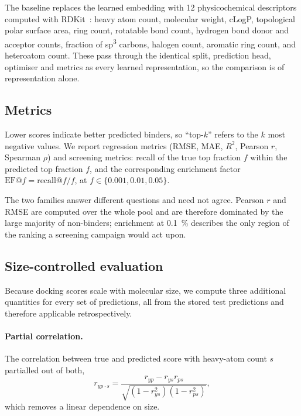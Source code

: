 The baseline replaces the learned embedding with \num{12} physicochemical
descriptors computed with RDKit~\citep{rdkit}: heavy atom count, molecular
weight, \mbox{cLogP}, topological polar surface area, ring count, rotatable
bond count, hydrogen bond donor and acceptor counts, fraction of sp\textsuperscript{3}
carbons, halogen count, aromatic ring count, and heteroatom count. These pass
through the identical split, prediction head, optimiser and metrics as every
learned representation, so the comparison is of representation alone.

\subsection{Metrics}

Lower scores indicate better predicted binders, so ``top-$k$'' refers to the
$k$ most negative values. We report regression metrics (RMSE, MAE, $R^2$,
Pearson $r$, Spearman $\rho$) and screening metrics: recall of the true top
fraction $f$ within the predicted top fraction $f$, and the corresponding
enrichment factor $\mathrm{EF}@f = \mathrm{recall}@f / f$, at
$f \in \{0.001, 0.01, 0.05\}$.

The two families answer different questions and need not agree. Pearson $r$
and RMSE are computed over the whole pool and are therefore dominated by the
large majority of non-binders; enrichment at \SI{0.1}{\percent} describes the
only region of the ranking a screening campaign would act upon.

\subsection{Size-controlled evaluation}
\label{sec:methods-size}

Because docking scores scale with molecular size, we compute three additional
quantities for every set of predictions, all from the stored test predictions
and therefore applicable retrospectively.

\paragraph{Partial correlation.}
The correlation between true and predicted score with heavy-atom count $s$
partialled out of both,
\begin{equation}
r_{yp \cdot s} = \frac{r_{yp} - r_{ys} r_{ps}}
                      {\sqrt{(1 - r_{ys}^2)(1 - r_{ps}^2)}},
\end{equation}
which removes a linear dependence on size.

